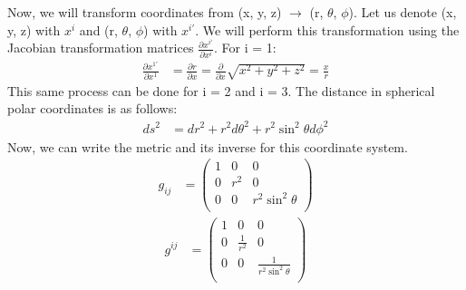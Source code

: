 \documentclass[11pt]{article}
\begin{document}
\begin{example}
    Now, we will transform coordinates from (x, y, z) $\to$ (r, $\theta$, $\phi$). Let us denote (x, y, z) with $x^i$ and (r, $\theta$, $\phi$) with $x^{i'}$. We will perform this transformation using the Jacobian transformation matrices $\frac{\partial x^{i'}}{\partial x^{i}}$. 
    For i = 1:
        \begin{equation}
            \begin{aligned}
            \frac{\partial x^{1'}}{\partial x^1} &= \frac{\partial r}{\partial x} = \frac{\partial}{\partial x} \sqrt{x^2 + y^2 + z^2} = \frac{x}{r}
            \end{aligned}
        \end{equation}
    This same process can be done for i = 2 and i = 3. The distance in spherical polar coordinates is as follows:
        \begin{equation}
            \begin{aligned}
            ds^2 &= dr^2 + r^2d\theta^2 + r^2 \sin^2{\theta}d\phi^2
            \end{aligned}
        \end{equation}
    Now, we can write the metric and its inverse for this coordinate system.
        \begin{equation}
            \begin{aligned}
            g_{ij} &= \begin{pmatrix}
                        1  &  0  &  0\\
                        0  &  r^2  &  0\\
                        0  &  0  &  r^2\sin^2{\theta}\\
                        \end{pmatrix}
            \end{aligned}
        \end{equation}
        \begin{equation}
            \begin{aligned}
            g^{ij} &= \begin{pmatrix}
                        1  &  0  &  0\\
                        0  &  \frac{1}{r^2}  &  0\\
                        0  &  0  &  \frac{1}{r^2\sin^2{\theta}}\\
                        \end{pmatrix}
            \end{aligned}
        \end{equation}
    \end{example}
    
\end{document}
